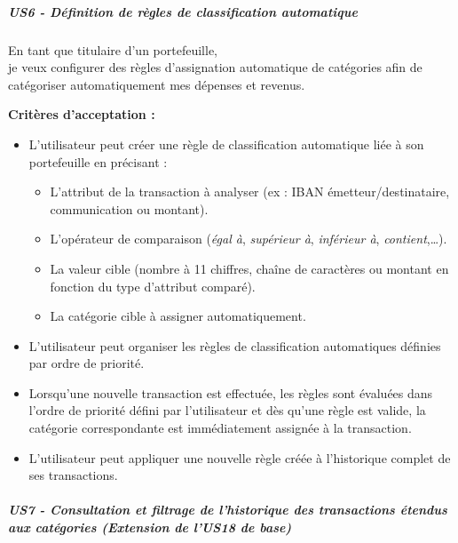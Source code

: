 \hypertarget{us6---duxe9finition-de-ruxe8gles-de-classification-automatique}{%
\subparagraph{US6 - Définition de règles de classification
automatique}\label{us6---duxe9finition-de-ruxe8gles-de-classification-automatique}}

En tant que titulaire d'un portefeuille,\\
je veux configurer des règles d'assignation automatique de catégories
afin de catégoriser automatiquement mes dépenses et revenus.

\textbf{Critères d'acceptation :}

\begin{itemize}
\tightlist
\item
  L'utilisateur peut créer une règle de classification automatique liée
  à son portefeuille en précisant :

  \begin{itemize}
  \tightlist
  \item
    L'attribut de la transaction à analyser (ex : IBAN
    émetteur/destinataire, communication ou montant).
  \item
    L'opérateur de comparaison (\emph{égal à}, \emph{supérieur à},
    \emph{inférieur à}, \emph{contient},\ldots).
  \item
    La valeur cible (nombre à 11 chiffres, chaîne de caractères ou
    montant en fonction du type d'attribut comparé).
  \item
    La catégorie cible à assigner automatiquement.
  \end{itemize}
\item
  L'utilisateur peut organiser les règles de classification automatiques
  définies par ordre de priorité.
\item
  Lorsqu'une nouvelle transaction est effectuée, les règles sont
  évaluées dans l'ordre de priorité défini par l'utilisateur et dès
  qu'une règle est valide, la catégorie correspondante est immédiatement
  assignée à la transaction.
\item
  L'utilisateur peut appliquer une nouvelle règle créée à l'historique
  complet de ses transactions.
\end{itemize}

\hypertarget{us7---consultation-et-filtrage-de-lhistorique-des-transactions-uxe9tendus-aux-catuxe9gories-extension-de-lus18-de-base}{%
\subparagraph{US7 - Consultation et filtrage de l'historique des
transactions étendus aux catégories (Extension de l'US18 de
base)}\label{us7---consultation-et-filtrage-de-lhistorique-des-transactions-uxe9tendus-aux-catuxe9gories-extension-de-lus18-de-base}}

